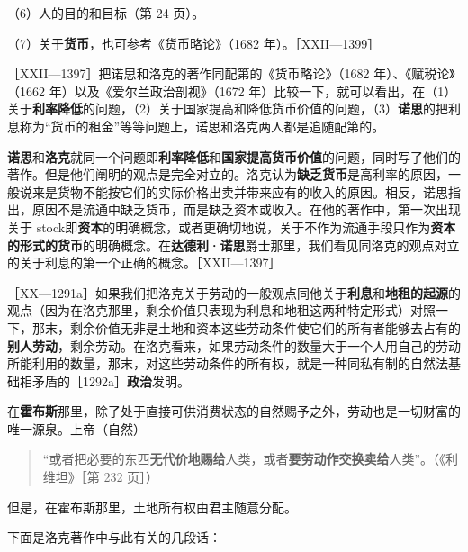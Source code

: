 （6）人的目的和目标（第 24 页）。

（7）关于\textbf{货币}，也可参考《货币略论》（1682 年）。［XXII—1399］


［XXII—1397］把诺思和洛克的著作同配第的《货币略论》（1682 年）、《赋税论》（1662 年）以及《爱尔兰政治剖视》（1672 年）比较一下，就可以看出，在（1）关于\textbf{利率降低}的问题，（2）关于国家提高和降低货币价值的问题，（3）\textbf{诺思}的把利息称为“货币的租金”等等问题上，诺思和洛克两人都是追随配第的。

\textbf{诺思}和\textbf{洛克}就同一个问题即\textbf{利率降低}和\textbf{国家提高货币价值}的问题，同时写了他们的著作。但是他们阐明的观点是完全对立的。洛克认为\textbf{缺乏货币}是高利率的原因，一般说来是货物不能按它们的实际价格出卖并带来应有的收入的原因。相反，诺思指出，原因不是流通中缺乏货币，而是缺乏资本或收入。在他的著作中，第一次出现关于 stock即\textbf{资本}的明确概念，或者更确切地说，关于不作为流通手段只作为\textbf{资本的形式的货币}的明确概念。在\textbf{达德利·诺思}爵士那里，我们看见同洛克的观点对立的关于利息的第一个正确的概念。［XXII—1397］



［XX—1291a］如果我们把洛克关于劳动的一般观点同他关于\textbf{利息}和\textbf{地租的起源}的观点（因为在洛克那里，剩余价值只表现为利息和地租这两种特定形式）对照一下，那末，剩余价值无非是土地和资本这些劳动条件使它们的所有者能够去占有的\textbf{别人劳动}，剩余劳动。在洛克看来，如果劳动条件的数量大于一个人用自己的劳动所能利用的数量，那末，对这些劳动条件的所有权，就是一种同私有制的自然法基础相矛盾的［1292a］\textbf{政治}发明。

\fontbox{~\{}在\textbf{霍布斯}那里，除了处于直接可供消费状态的自然赐予之外，劳动也是一切财富的唯一源泉。上帝（自然）

\begin{quote}“或者把必要的东西\textbf{无代价地赐给}人类，或者\textbf{要劳动作交换卖给}人类”。（《利维坦》［第 232 页］）\end{quote}

但是，在霍布斯那里，土地所有权由君主随意分配。\fontbox{\}~}

下面是洛克著作中与此有关的几段话：

